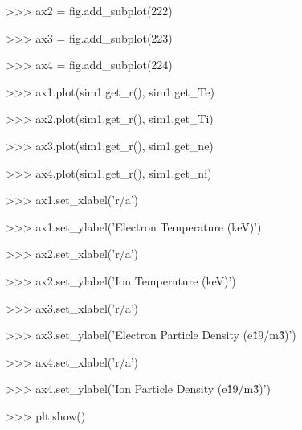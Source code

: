 \documentclass{article}
\begin{document}
>>> ax2 = fig.add\_subplot(222)

>>> ax3 = fig.add\_subplot(223)

>>> ax4 = fig.add\_subplot(224)

>>> ax1.plot(sim1.get\_r(), sim1.get\_Te)

>>> ax2.plot(sim1.get\_r(), sim1.get\_Ti)

>>> ax3.plot(sim1.get\_r(), sim1.get\_ne)

>>> ax4.plot(sim1.get\_r(), sim1.get\_ni)

>>> ax1.set\_xlabel('r/a')

>>> ax1.set\_ylabel('Electron Temperature (keV)')

>>> ax2.set\_xlabel('r/a')

>>> ax2.set\_ylabel('Ion Temperature (keV)')

>>> ax3.set\_xlabel('r/a')

>>> ax3.set\_ylabel('Electron Particle Density (e\^19/m\^3)')

>>> ax4.set\_xlabel('r/a')

>>> ax4.set\_ylabel('Ion Particle Density (e\^19/m\^3)')

>>> plt.show()
\end{document}
